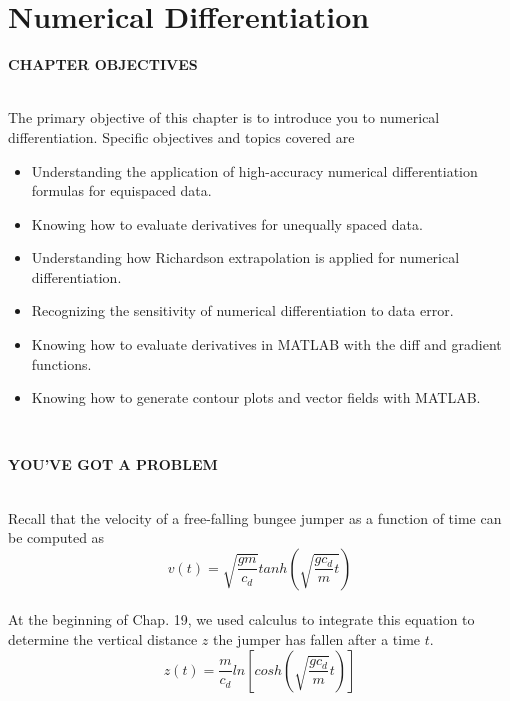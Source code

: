 


\part*{Numerical Differentiation}

\vspace{1,5in}

\begin{center}\begin{Large}\textbf{CHAPTER OBJECTIVES}\end{Large}\end{center}\\
The primary objective of this chapter is to introduce you to numerical differentiation.
Specific objectives and topics covered are

\begin{itemize}
	\item Understanding the application of high-accuracy numerical differentiation
formulas for equispaced data.
	\item Knowing how to evaluate derivatives for unequally spaced data.
	\item Understanding how Richardson extrapolation is applied for numerical
differentiation.
	\item Recognizing the sensitivity of numerical differentiation to data error.
	\item Knowing how to evaluate derivatives in MATLAB with the diff and gradient
functions.
	\item Knowing how to generate contour plots and vector fields with MATLAB.
\end{itemize}\\
\vspace{0.3in}
\begin{Large}\textbf{YOU’VE GOT A PROBLEM}\end{Large}\\
Recall that the velocity of a free-falling bungee jumper as a function of time can be
computed as
\begin{equation}
	\tag{21.1}
	v(t) = \sqrt{\dfrac{gm}{c_{d}}} tanh \left( \sqrt{\dfrac{gc_{d}}{m} t} \right)
\end{equation}\\
At the beginning of Chap. 19, we used calculus to integrate this equation to determine the
vertical distance $z$ the jumper has fallen after a time $t$.
\begin{equation}
	\tag{21.2}
	z(t) = \dfrac{m}{c_{d}} ln \left[ cosh \left( \sqrt{\dfrac{gc_{d}}{m}} t \right) \right]
\end{equation}

